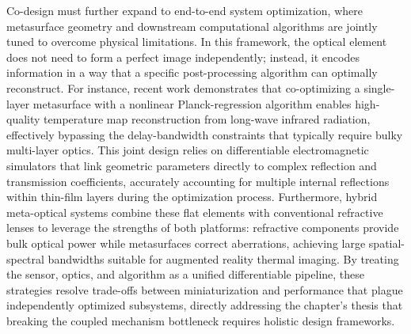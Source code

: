 \documentclass[11pt]{article}
\begin{document}
Co-design must further expand to end-to-end system optimization, where metasurface geometry and downstream computational algorithms are jointly tuned to overcome physical limitations. In this framework, the optical element does not need to form a perfect image independently; instead, it encodes information in a way that a specific post-processing algorithm can optimally reconstruct. For instance, recent work demonstrates that co-optimizing a single-layer metasurface with a nonlinear Planck-regression algorithm enables high-quality temperature map reconstruction from long-wave infrared radiation, effectively bypassing the delay-bandwidth constraints that typically require bulky multi-layer optics. This joint design relies on differentiable electromagnetic simulators that link geometric parameters directly to complex reflection and transmission coefficients, accurately accounting for multiple internal reflections within thin-film layers during the optimization process. Furthermore, hybrid meta-optical systems combine these flat elements with conventional refractive lenses to leverage the strengths of both platforms: refractive components provide bulk optical power while metasurfaces correct aberrations, achieving large spatial-spectral bandwidths suitable for augmented reality thermal imaging. By treating the sensor, optics, and algorithm as a unified differentiable pipeline, these strategies resolve trade-offs between miniaturization and performance that plague independently optimized subsystems, directly addressing the chapter's thesis that breaking the coupled mechanism bottleneck requires holistic design frameworks. \citep{doi_10_1002_adom_202402498_4083d234} \citep{doi_10_1002_lpor_71431_d57da40c}
\end{document}
